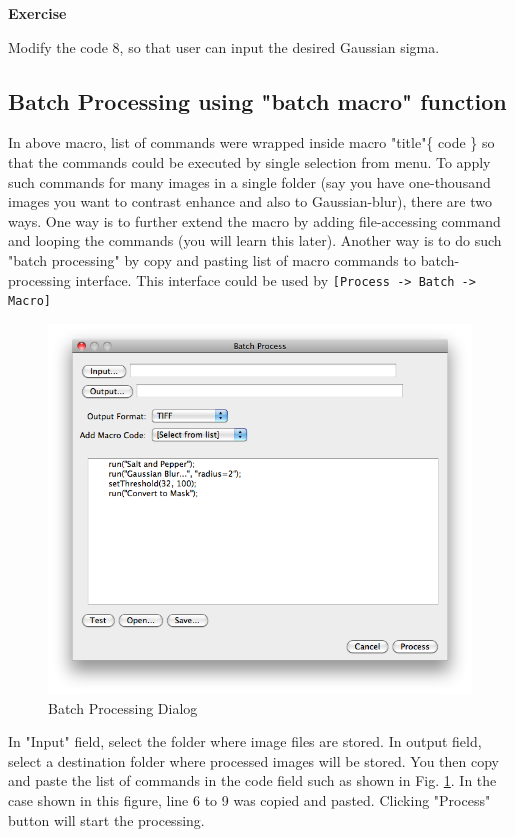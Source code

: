 \documentclass[11pt,a4paper,oneside]{report}
\newenvironment{indentexercise}[1]%
{{\setlength{\leftmargin}{2em}}%
\textbf{Exercise \thesubsection-#1}%
\begin{list}{}%
	\item%
}
{\end{list}}
\newcommand{\ijmenu}[1]{\texttt{\small#1}}
\begin{document}
\begin{indentexercise}{1}
Modify the code 8, so that user can input the desired Gaussian sigma.
\end{indentexercise}


\subsection{Batch Processing using "batch macro" function}
In above macro, list of commands were wrapped inside macro "title"\{ code \} 
so that the commands could be executed by single selection from menu. 
To apply such commands for many images in a single folder 
(say you have one-thousand images you want to contrast enhance and also to Gaussian-blur), 
there are two ways. One way is to further extend the macro by adding file-accessing command and 
looping the commands (you will learn this later). 
Another way is to do such "batch processing" by copy and pasting list of
macro commands to batch-processing interface. 
This interface could be used by \ijmenu{[Process -> Batch -> Macro]}

\begin{figure}[htbp]
\begin{center}
\includegraphics[scale=0.4]{fig/BatchProcessing.png}
\caption{Batch Processing Dialog} \label{fig_BatchProcessInterface}
\end{center}
\end{figure}

In "Input" field, select the folder where image files are stored. 
In output field, select a destination folder where processed images will be stored. 
You then copy and paste the list of commands in the code field such as 
shown in Fig. \ref{fig_BatchProcessInterface}. 
In the case shown in this figure, line 6 to 9 was copied and pasted. 
Clicking "Process" button will start the processing.
\newpage
\end{document}
